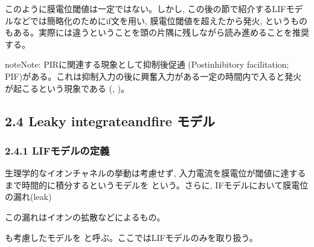 \documentclass[letterpaper,10pt,english]{sphinxmanual}
\begin{document}
このように膜電位閾値は一定ではない。しかし, この後の節で紹介するLIFモデルなどでは簡略化のためにif文を用い, 膜電位閾値を超えたから発火, というものもある。実際には違うということを頭の片隅に残しながら読み進めることを推奨する。

\begin{sphinxadmonition}{note}{Note:}
PIRに関連する現象として抑制後促通 (Postinhibitory facilitation; PIF)がある。これは抑制入力の後に興奮入力がある一定の時間内で入ると発火が起こるという現象である (, )。
\end{sphinxadmonition}


\subsection{2.4 Leaky integrate\sphinxhyphen{}and\sphinxhyphen{}fire モデル}
\label{\detokenize{2-4_lif:leaky-integrate-and-fire}}\label{\detokenize{2-4_lif::doc}}

\subsubsection{2.4.1 LIFモデルの定義}
\label{\detokenize{2-4_lif:lif}}
生理学的なイオンチャネルの挙動は考慮せず, 入力電流を膜電位が閾値に達するまで時間的に積分するというモデルを という。さらに, IFモデルにおいて膜電位の漏れ(leak)%
\begin{footnote}[1]\sphinxAtStartFootnote
この漏れはイオンの拡散などによるもの。
%
\end{footnote}も考慮したモデルを  と呼ぶ。ここではLIFモデルのみを取り扱う。
\end{document}
